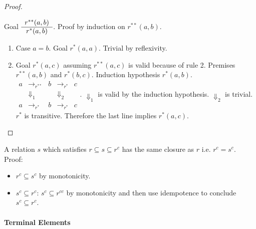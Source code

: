 \begin{theorem}
\begin{proof}
\begin{itemize}
\begin{itemize}
        Goal $\begin{array}{c} r^{**}(a,b) \\ \hline r^*(a,b)\end{array}$. Proof by induction on $r^{**}(a,b)$.
        \begin{enumerate}
        \item
          Case $a=b$. Goal $r^*(a,a)$. Trivial by reflexivity.
        \item
          Goal $r^*(a,c)$ assuming $r^{**}(a,c)$ is valid because of rule 2.
          Premises $r^{**}(a,b)$ and $r^*(b,c)$. Induction
          hypothesis $r^*(a,b)$.
          $
          \begin{matrix}
            a  & \to_{r^{**}} & b   &  \to_{r^*}   & c \\
                &    \Downarrow_1 & &  \Downarrow_2\\
            a  & \to_{r^*} & b   &     \to_{r^*}   &  c
          \end{matrix}$.
          $\Downarrow_1$ is valid by the induction
          hypothesis. $\Downarrow_2$ is trivial. $r^*$ is
          transitive. Therefore the last line implies $r^*(a,c)$.
        \end{enumerate}
      \end{itemize}
    \end{itemize}
  \end{proof}
\end{theorem}






\begin{theorem}
  \label{sameclosure}
A relation $s$ which satisfies $r \subseteq s \subseteq r^c$ has the same closure
as $r$ i.e. $r^c = s^c$. Proof:
  \begin{itemize}
  \item $r^c \subseteq s^c$ by monotonicity.
  \item $s^c \subseteq r^c$: $s^c \subseteq r^{cc}$ by
    monotonicity and then use idempotence to conclude $s^c \subseteq r^c$.
  \end{itemize}
\end{theorem}





\paragraph{Terminal Elements}

